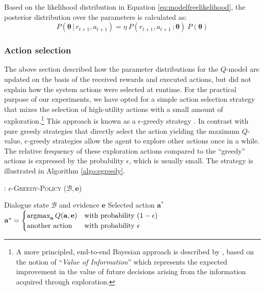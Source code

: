 Based on the likelihood distribution in Equation \eqref{eq:modelfreelikelihood}, the posterior distribution over the parameters is calculated as: 
\begin{equation}
P(\boldsymbol\theta \, | \, r_{t+1}, a_{t+1}) = \eta \ P(r_{t+1}, a_{t+1} \,; \boldsymbol\theta)  \ P(\boldsymbol\theta)  \label{eq:posteriormodelfree}
\end{equation}


\subsubsection*{Action selection}

The above section described how the parameter distributions for the $Q$-model are updated on the basis of the received rewards and executed actions, but did not explain how the system actions were selected at runtime.  For the practical purpose of our experiments, we have opted for a simple action selection strategy that mixes the selection of high-utility actions with a small amount of exploration.\footnote{A more principled, end-to-end Bayesian approach is described by \cite{Dearden:1998}, based on the notion of ``\textit{Value of Information}'' which represents the expected improvement in the value of future decisions arising from the information acquired through exploration. }  This approach is known as a $\epsilon$-greedy strategy \citep{citeulike:112017}.  In contrast with pure greedy strategies that directly select the action yielding the maximum $Q$-value, $\epsilon$-greedy strategies allow the agent to explore other actions once in a while. The relative frequency of these exploration actions compared to the  ``greedy'' actions is expressed by the probability $\epsilon$, which is usually small. The strategy is illustrated in Algorithm \ref{algo:egreedy}.

\begin{algorithm}[h!]
\caption{: \textsc{$\epsilon$-Greedy-Policy} ($\mathcal{B}, \mathbf{e}$)}
\begin{algorithmic}[1] \vspace{1mm}
\REQUIRE Dialogue state $\mathcal{B}$ and evidence $\mathbf{e}$
\ENSURE Selected action $\mathbf{a}^*$
\RETURN $\mathbf{a}^* = \begin{cases} \argmax_{\mathbf{a}} Q(\mathbf{a}, \mathbf{e}) & \text{with probability } (1- \epsilon) \\ \text{another action} & \text{with probability } \epsilon \end{cases}$
\end{algorithmic}
\label{algo:egreedy}
\end{algorithm}

